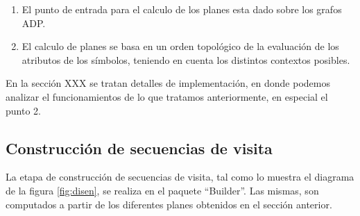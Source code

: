 \begin{enumerate}
\item El punto de entrada para el calculo de los planes esta dado sobre los grafos ADP. 
\item El calculo de planes se basa en un orden topológico de la evaluación de los atributos de los símbolos, teniendo en cuenta los distintos contextos posibles.
\end{enumerate}
En la sección XXX se tratan detalles de implementación, en donde podemos analizar el funcionamientos de lo que tratamos anteriormente, en especial el punto 2.


\subsection*{Construcción de secuencias de visita}
La etapa de construcción de secuencias de visita, tal como lo muestra el diagrama de la figura \ref{fig:disen}, se realiza en el paquete ``Builder''. Las mismas, son computados a partir de los diferentes planes obtenidos en el sección anterior.

